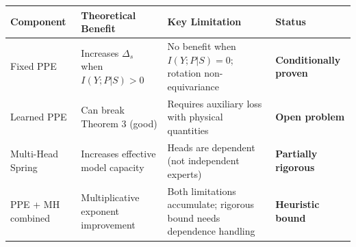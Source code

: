 \documentclass[
  12pt,
]{article}
\begin{document}
\begin{longtable}[]{@{}
  >{\raggedright\arraybackslash}p{}
  >{\raggedright\arraybackslash}p{}
  >{\raggedright\arraybackslash}p{}
  >{\raggedright\arraybackslash}p{}@{}}
\toprule\noalign{}
\begin{minipage}[b]{\linewidth}\raggedright
Component
\end{minipage} & \begin{minipage}[b]{\linewidth}\raggedright
Theoretical Benefit
\end{minipage} & \begin{minipage}[b]{\linewidth}\raggedright
Key Limitation
\end{minipage} & \begin{minipage}[b]{\linewidth}\raggedright
Status
\end{minipage} \\
\midrule\noalign{}
\endhead
\bottomrule\noalign{}
\endlastfoot
Fixed PPE & Increases $\Delta_s$ when $I(Y;P|S)>0$ & No benefit when $I(Y;P|S)=0$; rotation non-equivariance & \textbf{Conditionally proven} \\
Learned PPE & Can break Theorem 3 (good) & Requires auxiliary loss with physical quantities & \textbf{Open problem} \\
Multi-Head Spring & Increases effective model capacity & Heads are dependent (not independent experts) & \textbf{Partially rigorous} \\
PPE + MH combined & Multiplicative exponent improvement & Both limitations accumulate; rigorous bound needs dependence handling & \textbf{Heuristic bound} \\
\end{longtable}
\end{document}
